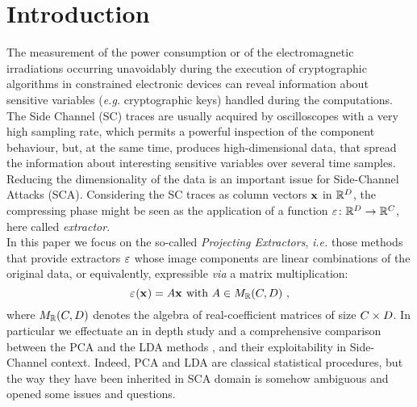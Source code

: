 \section{Introduction}
The measurement of the power consumption or of the electromagnetic irradiations occurring unavoidably during the execution of cryptographic algorithms in constrained electronic devices can reveal information about sensitive variables ({\em e.g.} cryptographic keys) handled during the computations. The Side Channel (SC) traces are usually acquired by oscilloscopes with a very high sampling rate, which permits a powerful inspection of the component behaviour, but, at the same time, produces high-dimensional data, that spread the information about interesting sensitive variables over several time samples. Reducing the dimensionality of the data is an important issue for Side-Channel Attacks (SCA). Considering the SC traces as column vectors ${\bf x}$ in $\mathbb{R}^\traceLength$, the compressing phase might be seen as the application of a function $\extract\colon \mathbb{R}^\traceLength\rightarrow \mathbb{R}^\newTraceLength$, here called {\em extractor}.\\

In this paper we focus on the so-called {\em Projecting Extractors}, {\em i.e.} those methods that provide extractors $\extract$ whose image components are linear combinations of the original data, or equivalently, expressible {\em via} a matrix multiplication:
\begin{equation}
\extractor{\sss[]{}} = A\sss[]{} \mbox{ with } A \in M_{\mathbb{R}}(\newTraceLength, \traceLength) \mbox{ ,}
\end{equation}
where $ M_{\mathbb{R}}(\newTraceLength, \traceLength)$ denotes the algebra of real-coefficient matrices of size $\newTraceLength \times \traceLength$.  In particular we effectuate an in depth study and a comprehensive comparison  between the PCA and the LDA methods \cite{fisher1938statistical,Fukunaga}, and their exploitability  in Side-Channel context.  Indeed, PCA and LDA are classical statistical procedures, but the way they have been inherited in SCA domain is somehow ambiguous and opened some issues and questions.\\

